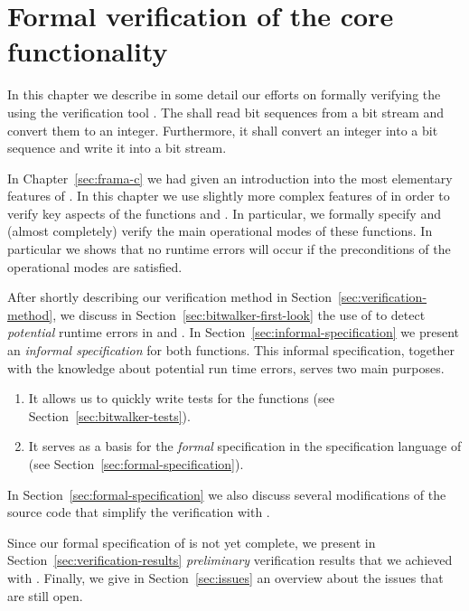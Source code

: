 
\chapter{Formal verification of the \bitwalker core functionality}
\label{sec:formal-verification}


In this chapter we describe in some detail
our efforts on formally verifying the \bitwalker using the verification
tool \framacwp.
The \bitwalker shall read bit sequences from a bit stream 
and convert them to an integer. Furthermore, it shall
convert an integer into a bit sequence and write it into a bit stream.

In Chapter~\ref{sec:frama-c} we had given an introduction
into the most elementary features of \framacwp.
In this chapter we use slightly more complex features of \framacwp
in order to verify key aspects of the \bitwalker functions \peek and \poke.
In particular, we formally specify and (almost completely) verify the
main operational modes of these functions.
In particular  we shows that no runtime errors will occur if the
preconditions of the operational modes are satisfied.

After shortly describing our verification method in Section~\ref{sec:verification-method},
we discuss in Section~\ref{sec:bitwalker-first-look}
the use of \framacwp to detect \emph{potential} runtime errors in \peek and \poke.
In Section~\ref{sec:informal-specification} we present an \emph{informal specification}
for both functions.
This informal specification, together with the knowledge about potential
run time errors, serves two main purposes.
\begin{enumerate}
\item  It allows us to quickly write tests for the \bitwalker functions 
       (see Section~\ref{sec:bitwalker-tests}).
\item It serves as a basis for the \emph{formal} specification in the \acsl
      specification language of \framacwp (see Section~\ref{sec:formal-specification}).
\end{enumerate}

In Section~\ref{sec:formal-specification} we also discuss several 
modifications of the source code that simplify the verification with \framacwp.

Since our formal specification of \bitwalker is not yet complete,
we present in Section~\ref{sec:verification-results} 
\emph{preliminary} verification results that we achieved with \framacwp.
Finally, we give in Section~\ref{sec:issues} an overview about the
issues that are still open.

